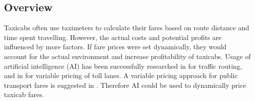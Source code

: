 \subsection{Overview}


Taxicabs often use taximeters to calculate their fares based on route distance
and time spent travelling. However, the actual costs and potential profits are
influenced by more factors. If fare prices were set dynamically, they would
account for the actual environment and increase profitability of taxicabs.
Usage of artificial intelligence (AI) has been successfully researched in
\textcite{Tavares2012ai+routing} for traffic routing, and in
\textcite{Lou2011ai+highways} for variable pricing of toll lanes. A variable
pricing approach for public transport fares is suggested in
\textcite{Emele2013pricing+rural}. Therefore AI could be used to dynamically price
taxicab fares.
